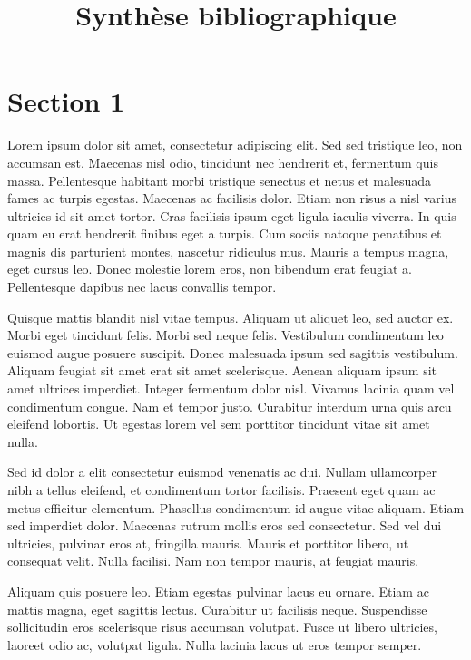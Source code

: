 \documentclass[conference]{./sty/IEEEtran}
\begin{document}
\title{Synthèse bibliographique}


\author{
}

\maketitle

\tableofcontents

\section{Section 1}
Lorem ipsum dolor sit amet, consectetur adipiscing elit. Sed sed tristique leo,
non accumsan est. Maecenas nisl odio, tincidunt nec hendrerit et, fermentum
quis massa. Pellentesque habitant morbi tristique senectus et netus et
malesuada fames ac turpis egestas. Maecenas ac facilisis dolor. Etiam non risus
a nisl varius ultricies id sit amet tortor. Cras facilisis ipsum eget ligula
iaculis viverra. In quis quam eu erat hendrerit finibus eget a turpis. Cum
sociis natoque penatibus et magnis dis parturient montes, nascetur ridiculus
mus. Mauris a tempus magna, eget cursus leo. Donec molestie lorem eros, non
bibendum erat feugiat a. Pellentesque dapibus nec lacus convallis tempor.


Quisque mattis blandit nisl vitae tempus. Aliquam ut aliquet leo, sed auctor
ex. Morbi eget tincidunt felis. Morbi sed neque felis. Vestibulum condimentum
leo euismod augue posuere suscipit. Donec malesuada ipsum sed sagittis
vestibulum. Aliquam feugiat sit amet erat sit amet scelerisque. Aenean aliquam
ipsum sit amet ultrices imperdiet. Integer fermentum dolor nisl. Vivamus
lacinia quam vel condimentum congue. Nam et tempor justo. Curabitur interdum
urna quis arcu eleifend lobortis. Ut egestas lorem vel sem porttitor tincidunt
vitae sit amet nulla.


Sed id dolor a elit consectetur euismod venenatis ac dui. Nullam ullamcorper
nibh a tellus eleifend, et condimentum tortor facilisis. Praesent eget quam ac
metus efficitur elementum. Phasellus condimentum id augue vitae aliquam. Etiam
sed imperdiet dolor. Maecenas rutrum mollis eros sed consectetur. Sed vel dui
ultricies, pulvinar eros at, fringilla mauris. Mauris et porttitor libero, ut
consequat velit. Nulla facilisi. Nam non tempor mauris, at feugiat mauris.


Aliquam quis posuere leo. Etiam egestas pulvinar lacus eu ornare. Etiam ac
mattis magna, eget sagittis lectus. Curabitur ut facilisis neque. Suspendisse
sollicitudin eros scelerisque risus accumsan volutpat. Fusce ut libero
ultricies, laoreet odio ac, volutpat ligula. Nulla lacinia lacus ut eros tempor
semper.
\end{document}
